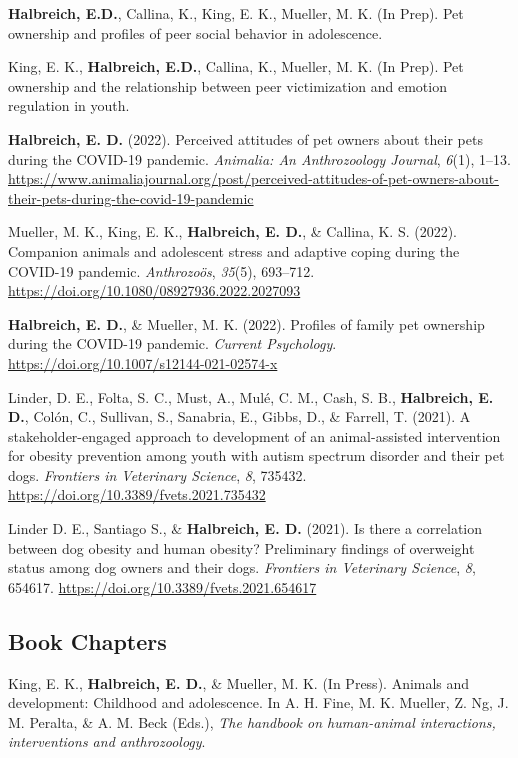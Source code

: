 \documentclass[10pt,a4paper,]{article}
\begin{document}
\textbf{Halbreich, E.D.}, Callina, K., King, E. K., Mueller, M. K. (In
Prep). Pet ownership and profiles of peer social behavior in
adolescence.

King, E. K., \textbf{Halbreich, E.D.}, Callina, K., Mueller, M. K. (In
Prep). Pet ownership and the relationship between peer victimization and
emotion regulation in youth.

\textbf{Halbreich, E. D.} (2022). Perceived attitudes of pet owners
about their pets during the COVID-19 pandemic. \emph{Animalia: An
Anthrozoology Journal}, \emph{6}(1), 1--13.
\url{https://www.animaliajournal.org/post/perceived-attitudes-of-pet-owners-about-their-pets-during-the-covid-19-pandemic}

Mueller, M. K., King, E. K., \textbf{Halbreich, E. D.}, \& Callina, K.
S. (2022). Companion animals and adolescent stress and adaptive coping
during the COVID-19 pandemic. \emph{Anthrozoös}, \emph{35}(5), 693--712.
\url{https://doi.org/10.1080/08927936.2022.2027093}

\textbf{Halbreich, E. D.}, \& Mueller, M. K. (2022). Profiles of family
pet ownership during the COVID-19 pandemic. \emph{Current Psychology}.
\url{https://doi.org/10.1007/s12144-021-02574-x}

Linder, D. E., Folta, S. C., Must, A., Mulé, C. M., Cash, S. B.,
\textbf{Halbreich, E. D.}, Colón, C., Sullivan, S., Sanabria, E., Gibbs,
D., \& Farrell, T. (2021). A stakeholder-engaged approach to development
of an animal-assisted intervention for obesity prevention among youth
with autism spectrum disorder and their pet dogs. \emph{Frontiers in
Veterinary Science}, \emph{8}, 735432.
\url{https://doi.org/10.3389/fvets.2021.735432}

Linder D. E., Santiago S., \& \textbf{Halbreich, E. D.} (2021). Is there
a correlation between dog obesity and human obesity? Preliminary
findings of overweight status among dog owners and their dogs.
\emph{Frontiers in Veterinary Science}, \emph{8}, 654617.
\url{https://doi.org/10.3389/fvets.2021.654617}

\hypertarget{book-chapters}{%
\subsection{Book Chapters}\label{book-chapters}}

King, E. K., \textbf{Halbreich, E. D.}, \& Mueller, M. K. (In Press).
Animals and development: Childhood and adolescence. In A. H. Fine, M. K.
Mueller, Z. Ng, J. M. Peralta, \& A. M. Beck (Eds.), \emph{The handbook
on human-animal interactions, interventions and anthrozoology}.
\end{document}
